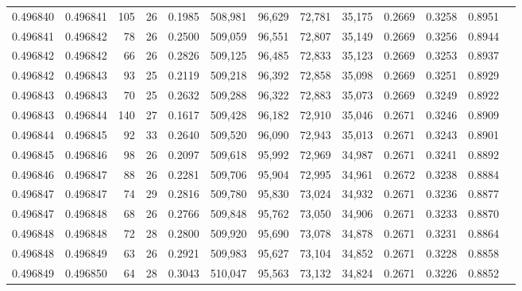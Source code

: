 \begin{tabular}{rrrrrrrrrrrrr}
0.496840 & 0.496841 & 105 &  26 &                                     0.1985 & 508,981 &  96,629 &  72,781 &  35,175 & 0.2669 & 0.3258 & 0.8951 \\
0.496841 & 0.496842 &  78 &  26 &                                     0.2500 & 509,059 &  96,551 &  72,807 &  35,149 & 0.2669 & 0.3256 & 0.8944 \\
0.496842 & 0.496842 &  66 &  26 &                                     0.2826 & 509,125 &  96,485 &  72,833 &  35,123 & 0.2669 & 0.3253 & 0.8937 \\
0.496842 & 0.496843 &  93 &  25 &                                     0.2119 & 509,218 &  96,392 &  72,858 &  35,098 & 0.2669 & 0.3251 & 0.8929 \\
0.496843 & 0.496843 &  70 &  25 &                                     0.2632 & 509,288 &  96,322 &  72,883 &  35,073 & 0.2669 & 0.3249 & 0.8922 \\
0.496843 & 0.496844 & 140 &  27 &                                     0.1617 & 509,428 &  96,182 &  72,910 &  35,046 & 0.2671 & 0.3246 & 0.8909 \\
0.496844 & 0.496845 &  92 &  33 &                                     0.2640 & 509,520 &  96,090 &  72,943 &  35,013 & 0.2671 & 0.3243 & 0.8901 \\
0.496845 & 0.496846 &  98 &  26 &                                     0.2097 & 509,618 &  95,992 &  72,969 &  34,987 & 0.2671 & 0.3241 & 0.8892 \\
0.496846 & 0.496847 &  88 &  26 &                                     0.2281 & 509,706 &  95,904 &  72,995 &  34,961 & 0.2672 & 0.3238 & 0.8884 \\
0.496847 & 0.496847 &  74 &  29 &                                     0.2816 & 509,780 &  95,830 &  73,024 &  34,932 & 0.2671 & 0.3236 & 0.8877 \\
0.496847 & 0.496848 &  68 &  26 &                                     0.2766 & 509,848 &  95,762 &  73,050 &  34,906 & 0.2671 & 0.3233 & 0.8870 \\
0.496848 & 0.496848 &  72 &  28 &                                     0.2800 & 509,920 &  95,690 &  73,078 &  34,878 & 0.2671 & 0.3231 & 0.8864 \\
0.496848 & 0.496849 &  63 &  26 &                                     0.2921 & 509,983 &  95,627 &  73,104 &  34,852 & 0.2671 & 0.3228 & 0.8858 \\
0.496849 & 0.496850 &  64 &  28 &                                     0.3043 & 510,047 &  95,563 &  73,132 &  34,824 & 0.2671 & 0.3226 & 0.8852 \\

\end{tabular}
